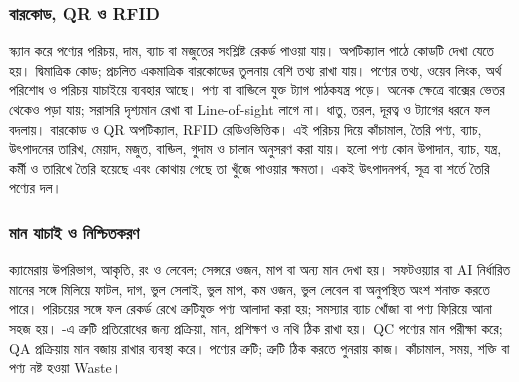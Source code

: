 \subsubsection{বারকোড, QR ও RFID}
স্ক্যান করে পণ্যের পরিচয়, দাম, ব্যাচ বা মজুতের সংশ্লিষ্ট রেকর্ড পাওয়া যায়। অপটিক্যাল পাঠে কোডটি দেখা যেতে হয়।  দ্বিমাত্রিক কোড; প্রচলিত একমাত্রিক বারকোডের তুলনায় বেশি তথ্য রাখা যায়। পণ্যের তথ্য, ওয়েব লিংক, অর্থ পরিশোধ ও পরিচয় যাচাইয়ে ব্যবহার আছে।
পণ্য বা বান্ডিলে যুক্ত ট্যাগ পাঠকযন্ত্র পড়ে। অনেক ক্ষেত্রে বাক্সের ভেতর থেকেও পড়া যায়; সরাসরি দৃশ্যমান রেখা বা Line-of-sight লাগে না। ধাতু, তরল, দূরত্ব ও ট্যাগের ধরনে ফল বদলায়। বারকোড ও QR অপটিক্যাল, RFID রেডিওভিত্তিক।
এই পরিচয় দিয়ে কাঁচামাল, তৈরি পণ্য, ব্যাচ, উৎপাদনের তারিখ, মেয়াদ, মজুত, বান্ডিল, গুদাম ও চালান অনুসরণ করা যায়।  হলো পণ্য কোন উপাদান, ব্যাচ, যন্ত্র, কর্মী ও তারিখে তৈরি হয়েছে এবং কোথায় গেছে তা খুঁজে পাওয়ার ক্ষমতা।  একই উৎপাদনপর্ব, সূত্র বা শর্তে তৈরি পণ্যের দল।
\subsubsection{মান যাচাই ও নিশ্চিতকরণ}
ক্যামেরায় উপরিভাগ, আকৃতি, রং ও লেবেল; সেন্সরে ওজন, মাপ বা অন্য মান দেখা হয়। সফটওয়্যার বা AI নির্ধারিত মানের সঙ্গে মিলিয়ে ফাটল, দাগ, ভুল সেলাই, ভুল মাপ, কম ওজন, ভুল লেবেল বা অনুপস্থিত অংশ শনাক্ত করতে পারে। পরিচয়ের সঙ্গে ফল রেকর্ড রেখে ত্রুটিযুক্ত পণ্য আলাদা করা হয়; সমস্যার ব্যাচ খোঁজা বা পণ্য ফিরিয়ে আনা সহজ হয়।
-এ ত্রুটি প্রতিরোধের জন্য প্রক্রিয়া, মান, প্রশিক্ষণ ও নথি ঠিক রাখা হয়। QC পণ্যের মান পরীক্ষা করে; QA প্রক্রিয়ায় মান বজায় রাখার ব্যবস্থা করে।  পণ্যের ত্রুটি;  ত্রুটি ঠিক করতে পুনরায় কাজ। কাঁচামাল, সময়, শক্তি বা পণ্য নষ্ট হওয়া Waste।
